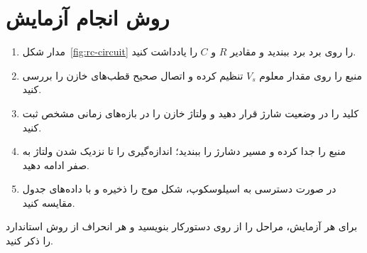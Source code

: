\section{روش انجام آزمایش}

\begin{enumerate}
  \item مدار شکل~\ref{fig:rc-circuit} را روی برد برد ببندید و مقادیر $R$ و $C$ را یادداشت کنید.
  \item منبع را روی مقدار معلوم $V_s$ تنظیم کرده و اتصال صحیح قطب‌های خازن را بررسی کنید.
  \item کلید را در وضعیت شارژ قرار دهید و ولتاژ خازن را در بازه‌های زمانی مشخص ثبت کنید.
  \item منبع را جدا کرده و مسیر دشارژ را ببندید؛ اندازه‌گیری را تا نزدیک شدن ولتاژ به صفر ادامه دهید.
  \item در صورت دسترسی به اسیلوسکوپ، شکل موج را ذخیره و با داده‌های جدول مقایسه کنید.
\end{enumerate}

برای هر آزمایش، مراحل را از روی دستورکار بنویسید و هر انحراف از روش استاندارد را ذکر کنید.
